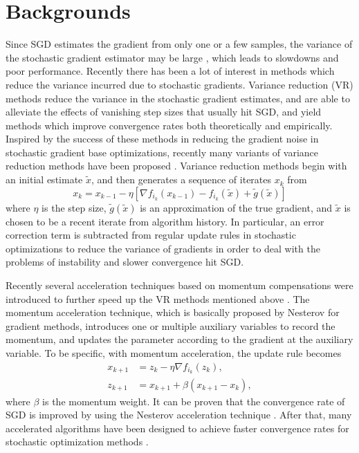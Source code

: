 \documentclass[10pt, conference, compsocconf]{IEEEtran}
\theoremstyle{definition}
\theoremstyle{remark}
\begin{document}
\section{Backgrounds}
Since SGD estimates the gradient from only one or a few samples, the variance of the stochastic gradient estimator may be large \cite{Johnson12,Zhao2015}, which leads to slowdowns and poor performance. Recently there has been a lot of interest in methods which reduce the variance incurred due to stochastic
gradients. Variance reduction (VR) methods \cite{Johnson12,Defazio2014} reduce the variance in the stochastic gradient estimates, and are able to alleviate the effects of vanishing step sizes that usually hit SGD, and yield methods which improve convergence rates both theoretically and empirically. 
Inspired by the success of these methods in reducing the gradient noise in stochastic gradient base optimizations, recently many variants of variance reduction methods have been proposed \cite{Konecny2016,Li2016,Shen2016,Xiao2014,Allen-Zhu2016}. Variance reduction methods begin with an initial estimate $\widetilde{x}$, and then generates a sequence of iterates $x_k$ from
\[x_k = x_{k-1} - \eta\left[\nabla f_{i_k}(x_{k-1})-f_{i_k}(\widetilde{x}) + \widetilde{g}(\widetilde{x})\right]
\]
where $\eta$ is the step size, $\widetilde{g}(\widetilde{x})$ is an approximation of the true gradient, and $\widetilde{x}$ is chosen to be a recent iterate from algorithm history. In particular, an error correction term is subtracted from regular update rules in stochastic optimizations to reduce the variance of gradients in order to deal with the problems of instability and slower convergence hit SGD.


Recently several acceleration techniques based on momentum compensations were introduced to further speed up the VR methods mentioned above \cite{Hu2009,Lin2015, Nitanda2014,Allen-Zhu17}. The momentum acceleration technique, which is basically proposed by Nesterov \cite{Nesterov2004} for gradient methods, introduces one or multiple auxiliary variables to record the momentum, and updates the parameter according to the gradient at the auxiliary variable. To be specific, with momentum acceleration, the update rule becomes
\begin{equation}
\begin{split}
x_{k+1}& = z_k-\eta \nabla f_{i_k}(z_k),\\
z_{k+1}& = x_{k+1} + \beta (x_{k+1}-x_{k}),
\end{split}
\end{equation}
where $\beta$ is the momentum weight. It can be proven that the convergence rate of SGD
is improved by using the Nesterov acceleration technique \cite{Hu2009}.
After that, many accelerated algorithms have been designed to achieve faster convergence rates for stochastic optimization methods \cite{Shalev-Shwartz2014,Allen-Zhu17,Fercoq2015,Lin2015}.
\end{document}
